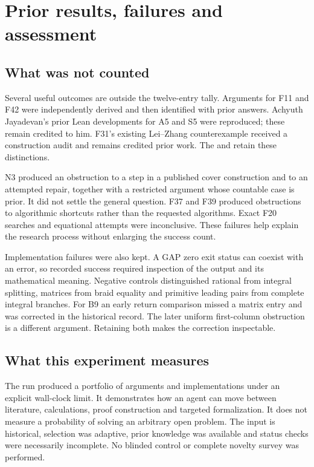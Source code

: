 \section{Prior results, failures and assessment}\label{sec:discussion}

\subsection{What was not counted}
Several useful outcomes are outside the twelve-entry tally. Arguments
for F11 and F42 were independently derived and then identified with
prior answers. Achyuth Jayadevan's prior Lean developments for A5 and S5
were reproduced; these remain credited to him. F31's existing
Lei--Zhang counterexample received a
construction audit and remains credited prior work. The
 and
 retain these distinctions.

N3 produced an obstruction to a step in a published cover construction
and to an attempted repair, together with a restricted argument whose
countable case is prior. It did not settle the general question.
F37 and F39 produced obstructions to algorithmic shortcuts rather than
the requested algorithms. Exact F20 searches and equational attempts
were inconclusive. These failures help explain the research process
without enlarging the success count.

Implementation failures were also kept. A GAP zero exit status can
coexist with an error, so recorded success required inspection of
the output and its mathematical meaning. Negative controls distinguished
rational from integral splitting, matrices from braid equality and
primitive leading pairs from complete integral branches. For B9 an
early return comparison missed a matrix entry and was corrected in
the historical record. The later uniform first-column obstruction is
a different argument. Retaining both makes the correction inspectable.

\subsection{What this experiment measures}
The run produced a portfolio of arguments and implementations under
an explicit wall-clock limit. It demonstrates how an agent can move
between literature, calculations, proof construction and targeted
formalization. It does not measure a probability of solving an arbitrary
open problem. The input is historical, selection was adaptive, prior
knowledge was available and status checks were necessarily incomplete.
No blinded control or complete novelty survey was performed.

